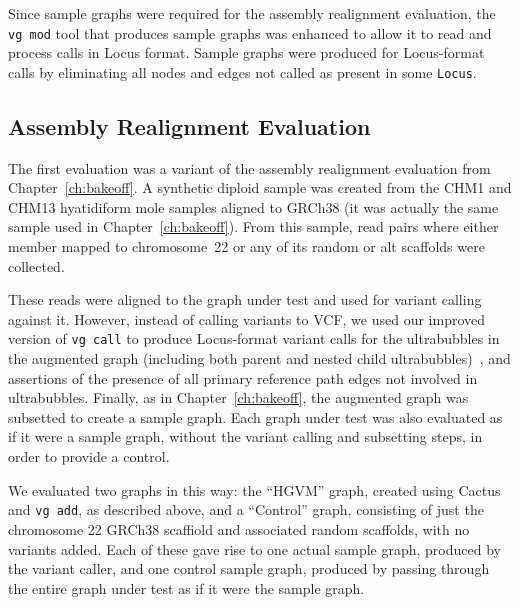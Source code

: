 Since sample graphs were required for the assembly realignment evaluation, the \texttt{vg mod} tool that produces sample graphs was enhanced to allow it to read and process calls in Locus format. Sample graphs were produced for Locus-format calls by eliminating all nodes and edges not called as present in some \texttt{Locus}.

\subsection{Assembly Realignment Evaluation}
\label{subsec:assemblyrealignmentevaluation}

The first evaluation was a variant of the assembly realignment evaluation from Chapter~\ref{ch:bakeoff}. A synthetic diploid sample was created from the CHM1 and CHM13 hyatidiform mole samples aligned to GRCh38 (it was actually the same sample used in Chapter~\ref{ch:bakeoff}). From this sample, read pairs where either member mapped to chromosome~22 or any of its random or alt scaffolds were collected. 

These reads were aligned to the graph under test and used for variant calling against it. However, instead of calling variants to VCF, we used our improved version of \texttt{vg call} to produce Locus-format variant calls for the ultrabubbles in the augmented graph (including both parent and nested child ultrabubbles)~\cite{paten2017superbubbles}, and assertions of the presence of all primary reference path edges not involved in ultrabubbles. Finally, as in Chapter~\ref{ch:bakeoff}, the augmented graph was subsetted to create a sample graph. Each graph under test was also evaluated as if it were a sample graph, without the variant calling and subsetting steps, in order to provide a control.

We evaluated two graphs in this way: the ``HGVM'' graph, created using Cactus and \texttt{vg add}, as described above, and a ``Control'' graph, consisting of just the chromosome 22 GRCh38 scaffiold and associated random scaffolds, with no variants added. Each of these gave rise to one actual sample graph, produced by the variant caller, and one control sample graph, produced by passing through the entire graph under test as if it were the sample graph.

